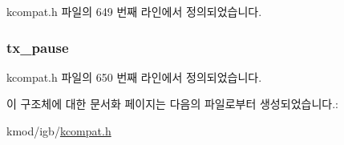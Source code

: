 kcompat.\+h 파일의 649 번째 라인에서 정의되었습니다.

\subsubsection[{\texorpdfstring{tx\+\_\+pause}{tx_pause}}]{ tx\+\_\+pause}\hypertarget{struct__kc__ethtool__pauseparam_a2d9c3fb4ec1c4ca00f7e7693b11b49c1}{}\label{struct__kc__ethtool__pauseparam_a2d9c3fb4ec1c4ca00f7e7693b11b49c1}


kcompat.\+h 파일의 650 번째 라인에서 정의되었습니다.



이 구조체에 대한 문서화 페이지는 다음의 파일로부터 생성되었습니다.\+:\begin{DoxyCompactItemize}
\item 
kmod/igb/\hyperlink{kcompat_8h}{kcompat.\+h}\end{DoxyCompactItemize}
